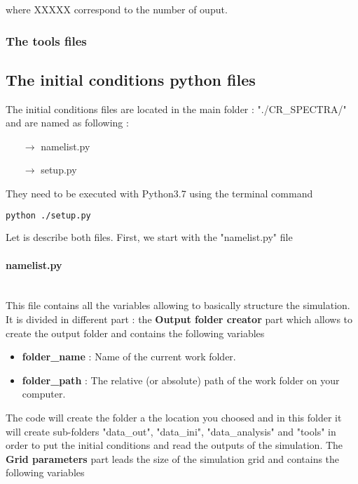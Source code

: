             \noi where XXXXX correspond to the number of ouput. 

        \subsubsection{The tools files}


    \subsection{The initial conditions python files}

        The initial conditions files are located in the main folder : "./CR\_SPECTRA/" and are named as following : 
                
        \begin{itemize}
            \item [$\rightarrow$] namelist.py 
            \item [$\rightarrow$] setup.py 
        \end{itemize}
        
        \noi They need to be executed with Python3.7 using the terminal command 

        \begin{lstlisting}[language=Bash]
            python ./setup.py
        \end{lstlisting}

        \noi Let is describe both files. First, we start with the "namelist.py" file 

        \paragraph*{namelist.py} \\ 

        \noi This file contains all the variables allowing to basically structure the simulation. It is divided in different part : 
        the {\bf{Output folder creator}} part which allows to create the output folder and contains the following variables

        \begin{itemize}
            \item {\bf{folder\_name}} : Name of the current work folder.  
            \item {\bf{folder\_path}} : The relative (or absolute) path of the work folder on your computer.
        \end{itemize}

        \noi The code will create the folder a the location you choosed and in this folder it will create sub-folders "data\_out", "data\_ini", "data\_analysis" and 
        "tools" in order to put the initial conditions and read the outputs of the simulation. The {\bf{Grid parameters}} part leads the size of the simulation grid and 
        contains the following variables 
        
